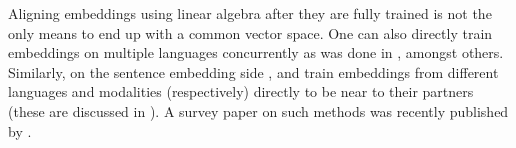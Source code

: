 \documentclass[parskip]{komatufte}
\begin{document}
Aligning embeddings using linear algebra after they are fully trained is not the only means to end up with a common vector space.
One can also directly train embeddings on multiple languages concurrently as was done in , amongst others.
Similarly, on the sentence embedding side \textcite{zou2013bilingual}, and  train embeddings from different languages and modalities (respectively) directly to be near to their partners (these are discussed in ).
A survey paper on such methods was recently published by .


\end{document}
